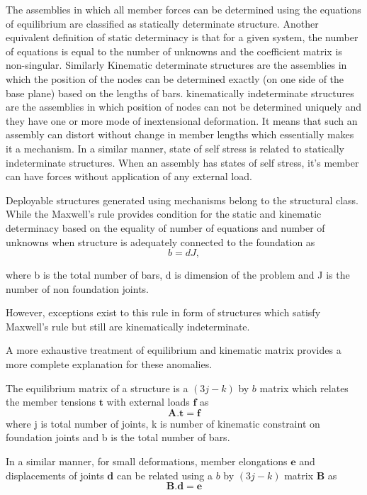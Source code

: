 The assemblies in which all member forces can be determined using the equations of equilibrium are classified as statically determinate structure. Another equivalent definition of static determinacy is that for a given system, the number of equations is equal to the number of unknowns and the coefficient matrix is non-singular. Similarly Kinematic determinate structures are the assemblies in which the position of the nodes can be determined exactly (on one side of the base plane) based on the lengths of bars. kinematically indeterminate structures are the assemblies in which position of nodes can not be determined uniquely and they have one or more mode of inextensional deformation. It means that such an assembly can distort without change in member lengths which essentially makes it a mechanism. In a similar manner, state of self stress is related to statically indeterminate structures. When an assembly has states of self stress, it's member can have forces without application of any external load. 

Deployable structures generated using mechanisms belong to the structural class. While the Maxwell's rule provides condition for the static and kinematic determinacy based on the equality of number of equations and number of unknowns when structure is adequately connected to the foundation as 
\begin{equation}
    b = dJ,
\label{eq:cacona}
\end{equation}

\noindent where b is the total number of bars, d is dimension of the problem and J is the number of non foundation joints.

However, exceptions exist to this rule in form of structures which satisfy Maxwell's rule but still are kinematically indeterminate.

A more exhaustive treatment of equilibrium and kinematic matrix provides a more complete explanation for these anomalies.

The equilibrium matrix of a structure is a $(3j - k)$ by $b$ matrix which relates the member tensions $\boldsymbol{t}$ with external loads $\boldsymbol{f}$ as
\begin{equation}
    \boldsymbol{A.t = f}
    \label{eq:cacona}
\end{equation}
\noindent where j is total number of joints, k is number of kinematic constraint on foundation joints and b is the total number of bars.

In a similar manner, for small deformations, member elongations $\boldsymbol{e}$ and displacements of joints $\boldsymbol{d}$ can be related using a $b$ by $(3j - k)$ matrix $\boldsymbol{B}$ as
\begin{equation}
    \boldsymbol{B.d = e}
    \label{eq:cacona}
\end{equation}

